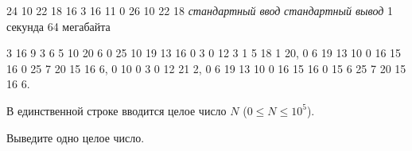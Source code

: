 \begin{problem}%
{24 10 22 18 16 3 16 11 0 26 10 22 18}%
{\textsl{стандартный ввод}}%
{\textsl{стандартный вывод}}%
{1 секунда}%
{64 мегабайта}{}

3 16 9 3 6 5 10 20 6 0 25 10 19 13 16 0 3 0 12 3 1 5 18 1 20, 0 6 19 13 10 0 16 15 16 0 25 7 20 15 16 6, 0 10 0 3 0 12 21 2, 0 6 19 13 10 0 16 15 16 0 15 6 25 7 20 15 16 6.

\InputFile

В единственной строке вводится целое число $N$ ($0 \le N \le 10^5$).

\OutputFile

Выведите одно целое число.

\Examples

\begin{example}
%
%
\end{example}
\end{problem}
